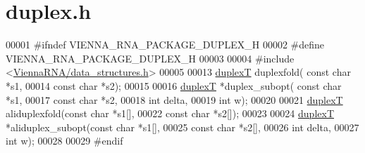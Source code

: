\hypertarget{duplex_8h_source}{}\section{duplex.\+h}
\label{duplex_8h_source}

\begin{DoxyCode}
00001 \textcolor{preprocessor}{#ifndef VIENNA\_RNA\_PACKAGE\_DUPLEX\_H}
00002 \textcolor{preprocessor}{#define VIENNA\_RNA\_PACKAGE\_DUPLEX\_H}
00003 
00004 \textcolor{preprocessor}{#include <\hyperlink{data__structures_8h}{ViennaRNA/data\_structures.h}>}
00005 
00013 \hyperlink{group__data__structures_structduplexT}{duplexT} duplexfold( \textcolor{keyword}{const} \textcolor{keywordtype}{char} *s1,
00014                     \textcolor{keyword}{const} \textcolor{keywordtype}{char} *s2);
00015 
00016 \hyperlink{group__data__structures_structduplexT}{duplexT} *duplex\_subopt( \textcolor{keyword}{const} \textcolor{keywordtype}{char} *s1,
00017                         \textcolor{keyword}{const} \textcolor{keywordtype}{char} *s2,
00018                         \textcolor{keywordtype}{int} delta,
00019                         \textcolor{keywordtype}{int} w);
00020 
00021 \hyperlink{group__data__structures_structduplexT}{duplexT} aliduplexfold(\textcolor{keyword}{const} \textcolor{keywordtype}{char} *s1[],
00022                       \textcolor{keyword}{const} \textcolor{keywordtype}{char} *s2[]);
00023 
00024 \hyperlink{group__data__structures_structduplexT}{duplexT} *aliduplex\_subopt(\textcolor{keyword}{const} \textcolor{keywordtype}{char} *s1[],
00025                           \textcolor{keyword}{const} \textcolor{keywordtype}{char} *s2[],
00026                           \textcolor{keywordtype}{int} delta,
00027                           \textcolor{keywordtype}{int} w);
00028 
00029 \textcolor{preprocessor}{#endif}
\end{DoxyCode}

